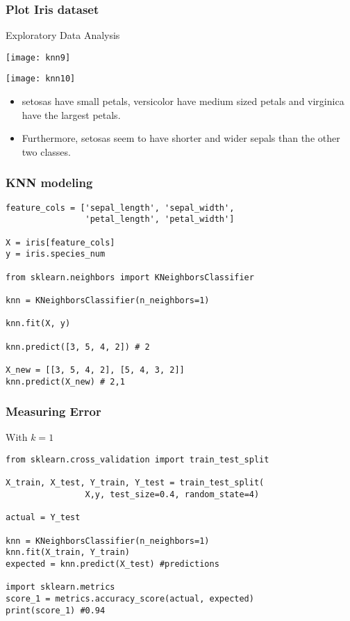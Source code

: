\begin{frame}[fragile]\frametitle{Plot Iris dataset}
Exploratory Data Analysis
\begin{center}
\texttt{[image: knn9]}

\texttt{[image: knn10]}
\end{center}
\begin{itemize}
\item setosas have small petals, versicolor have medium sized petals and virginica have the largest petals. 
\item Furthermore, setosas seem to have shorter and wider sepals than the other two classes. 
\end{itemize}
\end{frame}


\begin{frame}[fragile]\frametitle{KNN modeling}
\begin{lstlisting}
feature_cols = ['sepal_length', 'sepal_width', 
				'petal_length', 'petal_width']
				
X = iris[feature_cols]
y = iris.species_num

from sklearn.neighbors import KNeighborsClassifier

knn = KNeighborsClassifier(n_neighbors=1)

knn.fit(X, y)

knn.predict([3, 5, 4, 2]) # 2

X_new = [[3, 5, 4, 2], [5, 4, 3, 2]]
knn.predict(X_new) # 2,1
\end{lstlisting}
\end{frame}



\begin{frame}[fragile]\frametitle{Measuring Error}
With $k=1$
\begin{lstlisting}
from sklearn.cross_validation import train_test_split

X_train, X_test, Y_train, Y_test = train_test_split(
				X,y, test_size=0.4, random_state=4)
				
actual = Y_test

knn = KNeighborsClassifier(n_neighbors=1)
knn.fit(X_train, Y_train)
expected = knn.predict(X_test) #predictions

import sklearn.metrics
score_1 = metrics.accuracy_score(actual, expected)
print(score_1) #0.94

\end{lstlisting}
\end{frame}

